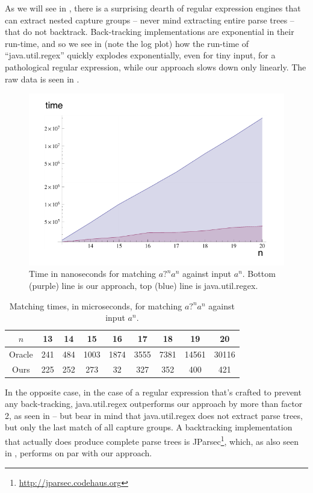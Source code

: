 \documentclass[english]{sigplanconf}
\theoremstyle{definition}
\begin{document}
As we will see in , there is a surprising dearth
of regular expression engines that can extract nested capture groups
-- never mind extracting entire parse trees -- that do not backtrack.
Back-tracking implementations are exponential in their run-time,
and so we see in  (note the log plot) how the run-time
of ``java.util.regex'' quickly explodes exponentially, even for tiny input, for
a pathological regular expression, while our approach slows down
only linearly. The raw data is seen in .

\begin{figure}[h]
\includegraphics[width=\linewidth]{graphs/pathological-with-axes.pdf}
\caption{Time in nanoseconds for matching $\textit{a?}^n\textit{a}^n$ against input $\textit{a}^n$. Bottom (purple) line is our approach, top (blue) line is java.util.regex.}
\end{figure}

\begin{table}
\begin{tabular}{ccccccccc|}
\hline 
$n$ & 13 & 14 & 15 & 16 & 17 & 18 & 19 & 20\tabularnewline
\hline 
\hline 
Oracle & 241 & 484 & 1003 & 1874 & 3555 & 7381 & 14561 & 30116\tabularnewline
\hline 
Ours & 225 & 252 & 273 & 32 & 327 & 352 & 400 & 421\tabularnewline
\hline 
\end{tabular}
\caption{Matching times, in microseconds, for matching $\textit{a?}^n\textit{a}^n$ against input $\textit{a}^n$.}
\end{table}

In the opposite case, in the case of a regular expression that's
crafted to prevent any back-tracking, java.util.regex outperforms
our approach by more than factor 2, as seen in  -- but
bear in mind that java.util.regex does not extract parse trees, but
only the last match of all capture groups.  A backtracking
implementation that actually does produce complete parse trees is
JParsec\footnote{\url{http://jparsec.codehaus.org}}, which, as also
seen in , performs on par with our approach. 
\end{document}
